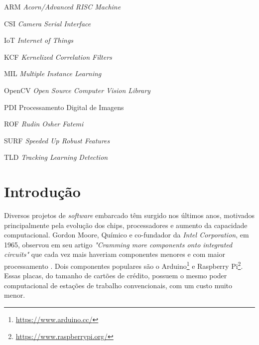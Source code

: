 \documentclass[12pt,oneside,a4paper,chapter=TITLE,section=TITLE,sumario=tradicional]{abntex2}
\begin{document}
\begin{siglas}
  \item[ARM] \textit{Acorn/Advanced RISC Machine}
  \item[CSI] \textit{Camera Serial Interface}
  \item[IoT] \textit{Internet of Things}
  \item[KCF] \textit{Kernelized Correlation Filters}
  \item[MIL] \textit{Multiple Instance Learning}
  \item[OpenCV] \textit{Open Source Computer Vision Library}
  \item[PDI] Processamento Digital de Imagens
  \item[ROF] \textit{Rudin Osher Fatemi}
  \item[SURF] \textit{Speeded Up Robust Features}
  \item[TLD] \textit{Tracking Learning Detection}
\end{siglas}

\sumario

\textual

\chapter{Introdução}
\label{cap:introducao}

Diversos projetos de \textit{software} embarcado têm surgido nos últimos anos, motivados principalmente pela evolução dos chips, processadores e aumento da capacidade computacional.
Gordon Moore, Químico e co-fundador da \textit{Intel Corporation}, em 1965, observou em seu artigo \textit{"Cramming more components onto integrated circuits"} que cada vez mais haveriam componentes menores e com maior processamento \cite{moore1998cramming}. Dois componentes populares são o Arduino\footnote{\url{https://www.arduino.cc/}} e Raspberry Pi\footnote{\url{https://www.raspberrypi.org/}}. Essas placas, do tamanho de cartões de crédito, possuem o mesmo poder computacional de estações de trabalho convencionais, com um custo muito menor. 
\end{document}
